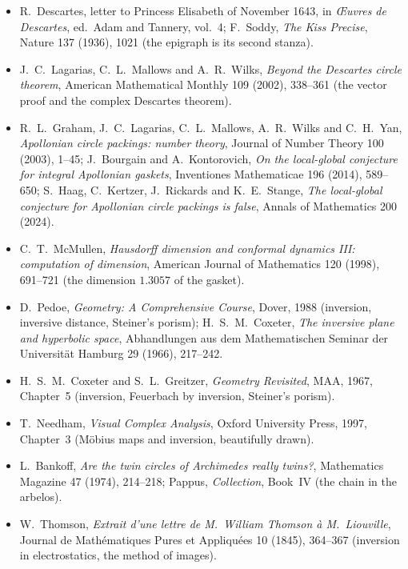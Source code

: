 \begin{itemize}
\item R.~Descartes, letter to Princess Elisabeth of November 1643, in \emph{\OE uvres de Descartes}, ed.\ Adam and Tannery, vol.~4; F.~Soddy,
\emph{The Kiss Precise}, Nature 137 (1936), 1021 (the epigraph is its second stanza).
\item J.~C.~Lagarias, C.~L.~Mallows and A.~R.~Wilks, \emph{Beyond the Descartes circle theorem}, American Mathematical Monthly 109 (2002), 338--361
(the vector proof and the complex Descartes theorem).
\item R.~L.~Graham, J.~C.~Lagarias, C.~L.~Mallows, A.~R.~Wilks and C.~H.~Yan, \emph{Apollonian circle packings: number theory}, Journal of Number
Theory 100 (2003), 1--45; J.~Bourgain and A.~Kontorovich, \emph{On the local-global conjecture for integral Apollonian gaskets}, Inventiones
Mathematicae 196 (2014), 589--650; S.~Haag, C.~Kertzer, J.~Rickards and K.~E.~Stange, \emph{The local-global conjecture for Apollonian circle
packings is false}, Annals of Mathematics 200 (2024).
\item C.~T.~McMullen, \emph{Hausdorff dimension and conformal dynamics III: computation of dimension}, American Journal of Mathematics 120 (1998),
691--721 (the dimension $1.3057$ of the gasket).
\item D.~Pedoe, \emph{Geometry: A Comprehensive Course}, Dover, 1988 (inversion, inversive distance, Steiner's porism); H.~S.~M.~Coxeter, \emph{The
inversive plane and hyperbolic space}, Abhandlungen aus dem Mathematischen Seminar der Universit\"at Hamburg 29 (1966), 217--242.
\item H.~S.~M.~Coxeter and S.~L.~Greitzer, \emph{Geometry Revisited}, MAA, 1967, Chapter~5 (inversion, Feuerbach by inversion, Steiner's porism).
\item T.~Needham, \emph{Visual Complex Analysis}, Oxford University Press, 1997, Chapter~3 (M\"obius maps and inversion, beautifully drawn).
\item L.~Bankoff, \emph{Are the twin circles of Archimedes really twins?}, Mathematics Magazine 47 (1974), 214--218; Pappus, \emph{Collection},
Book~IV (the chain in the arbelos).
\item W.~Thomson, \emph{Extrait d'une lettre de M.~William Thomson \`a M.~Liouville}, Journal de Math\'ematiques Pures et Appliqu\'ees 10 (1845),
364--367 (inversion in electrostatics, the method of images).
\end{itemize}
